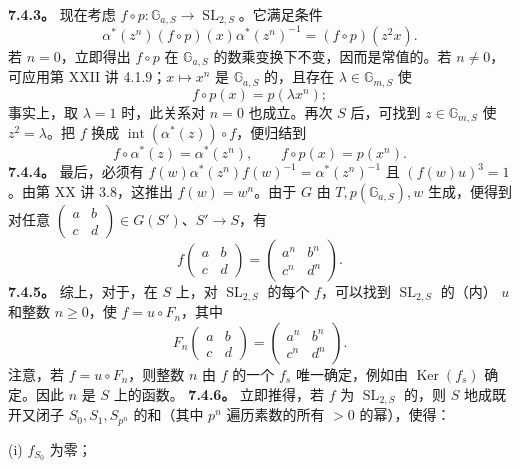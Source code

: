 \textbf{7.4.3。} 现在考虑 $f\circ p:\mathbb G_{a,S}\to\operatorname{SL}_{2,S}$。它满足条件
\[\alpha^*(z^n)(f\circ p)(x)\alpha^*(z^n)^{-1}=(f\circ p)(z^2x).\]
若 $n=0$，立即得出 $f\circ p$ 在 $\mathbb G_{a,S}$ 的数乘变换下不变，因而是常值的。若 $n\ne0$，可应用第 XXII 讲 4.1.9；$x\mapsto x^n$ 是 $\mathbb G_{a,S}$ 的，且存在 $\lambda\in\mathbb G_{m,S}$ 使
\[f\circ p(x)=p(\lambda x^n);\]
事实上，取 $\lambda=1$ 时，此关系对 $n=0$ 也成立。再次 $S$ 后，可找到 $z\in\mathbb G_{m,S}$ 使 $z^2=\lambda$。把 $f$ 换成 $\operatorname{int}(\alpha^*(z))\circ f$，便归结到
\[f\circ\alpha^*(z)=\alpha^*(z^n),\qquad f\circ p(x)=p(x^n).\]
\textbf{7.4.4。} 最后，必须有 $f(w)\alpha^*(z^n)f(w)^{-1}=\alpha^*(z^n)^{-1}$ 且 $(f(w)u)^3=1$。由第 XX 讲 3.8，这推出 $f(w)=w^n$。由于 $G$ 由 $T,p(\mathbb G_{a,S}),w$ 生成，便得到对任意 $\left(\begin{smallmatrix}a&b\\c&d\end{smallmatrix}\right)\in G(S')$、$S'\to S$，有
\[f\begin{pmatrix}a&b\\c&d\end{pmatrix}=\begin{pmatrix}a^n&b^n\\c^n&d^n\end{pmatrix}.\]
\textbf{7.4.5。} 综上，对于，在 $S$ 上，对 $\operatorname{SL}_{2,S}$ 的每个 $f$，可以找到 $\operatorname{SL}_{2,S}$ 的（内） $u$ 和整数 $n\geq0$，使 $f=u\circ F_n$，其中
\[F_n\begin{pmatrix}a&b\\c&d\end{pmatrix}=\begin{pmatrix}a^n&b^n\\c^n&d^n\end{pmatrix}.\]
注意，若 $f=u\circ F_n$，则整数 $n$ 由 $f$ 的一个 $f_s$ 唯一确定，例如由 $\operatorname{Ker}(f_s)$ 确定。因此 $n$ 是 $S$ 上的函数。
\textbf{7.4.6。} 立即推得，若 $f$ 为 $\operatorname{SL}_{2,S}$ 的，则 $S$ 地成既开又闭子 $S_0,S_1,S_{p^n}$ 的和（其中 $p^n$ 遍历素数的所有 $>0$ 的幂），使得：

(i) $f_{S_0}$ 为零；


